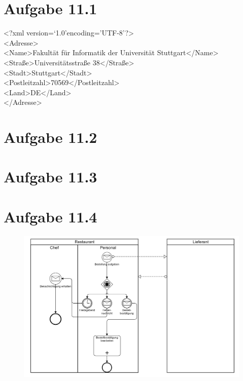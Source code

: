 \documentclass{article}
\begin{document}
	
	
	
	
	
	
	\section*{Aufgabe 11.1}
	<?xml version=\textquoteleft1.0\textquoteright encoding=\textquoteright UTF-8\textquoteright?>\\
	<Adresse>\\
	   \hspace*{10mm}<Name>Fakultät für Informatik der Universität Stuttgart</Name>\\
	   \hspace*{10mm}<Straße>Universitätsstraße 38</Straße>\\
	   \hspace*{10mm}<Stadt>Stuttgart</Stadt>\\
	   \hspace*{10mm}<Postleitzahl>70569</Postleitzahl>\\
	   \hspace*{10mm}<Land>DE</Land>\\
	</Adresse>
	
	
	
	\section*{Aufgabe 11.2}
	
	
	
	
	\section*{Aufgabe 11.3}
	
	
	
	\section*{Aufgabe 11.4}
		\begin{figure}[h!]
			\includegraphics[scale=0.19]{aufgabe_11_4.jpg}
		\end{figure}
	\pagebreak
	
\end{document}
